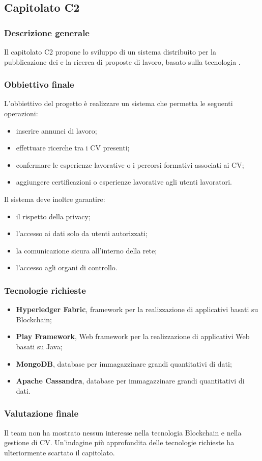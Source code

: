 \subsection{Capitolato C2}

\subsubsection{Descrizione generale}
Il capitolato C2 propone lo sviluppo di un sistema distribuito per la pubblicazione dei  e la ricerca di proposte di lavoro, basato sulla tecnologia .

\subsubsection{Obbiettivo finale}
L'obbiettivo del progetto è realizzare un sistema che permetta le seguenti operazioni:
\begin{itemize}
\item inserire annunci di lavoro;
\item effettuare ricerche tra i CV presenti;
\item confermare le esperienze lavorative o i percorsi formativi associati ai CV;
\item aggiungere certificazioni o esperienze lavorative agli utenti lavoratori.
\end{itemize}
Il sistema deve inoltre garantire:
\begin{itemize}
\item il rispetto della privacy;
\item l'accesso ai dati solo da utenti autorizzati;
\item la comunicazione sicura all'interno della rete;
\item l'accesso agli organi di controllo.
\end{itemize}

\subsubsection{Tecnologie richieste}
\begin{itemize}
\item \textbf{Hyperledger Fabric}, framework per la realizzazione di applicativi basati su Blockchain;
\item \textbf{Play Framework}, Web framework per la realizzazione di applicativi Web basati su Java;
\item \textbf{MongoDB}, database per immagazzinare grandi quantitativi di dati;
\item \textbf{Apache Cassandra}, database per immagazzinare grandi quantitativi di dati.
\end{itemize}

\subsubsection{Valutazione finale}
Il team non ha mostrato nessun interesse nella tecnologia Blockchain e nella gestione di CV. 
Un'indagine più approfondita delle tecnologie richieste ha ulteriormente scartato il capitolato.
